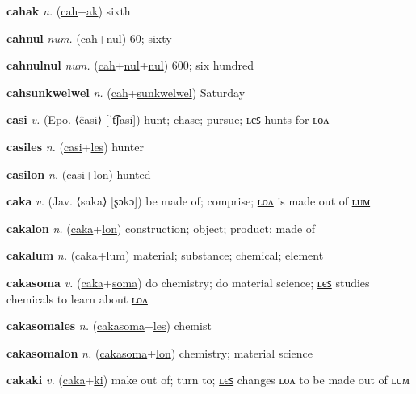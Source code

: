 \textbf{\hypertarget{cahak}{cahak}} \textit{n.} (\hyperlink{cah}{cah}+\allowbreak \hyperlink{ak}{ak})
sixth

\textbf{\hypertarget{cahnul}{cahnul}} \textit{num.} (\hyperlink{cah}{cah}+\allowbreak \hyperlink{nul}{nul})
60; sixty

\textbf{\hypertarget{cahnulnul}{cahnulnul}} \textit{num.} (\hyperlink{cah}{cah}+\allowbreak \hyperlink{nul}{nul}+\allowbreak \hyperlink{nul}{nul})
600; six hundred

\textbf{\hypertarget{cahsunkwelwel}{cahsunkwelwel}} \textit{n.} (\hyperlink{cah}{cah}+\allowbreak \hyperlink{sunkwelwel}{sunkwelwel})
Saturday

\textbf{\hypertarget{casi}{casi}} \textit{v.} (Epo. ⟨ĉasi⟩ [ˈt͡ʃasi])
hunt; chase; pursue; \hyperlink{casiles}{ʟєꜱ} hunts for \hyperlink{casilon}{ʟᴏᴧ}

\textbf{\hypertarget{casiles}{casiles}} \textit{n.} (\hyperlink{casi}{casi}+\allowbreak \hyperlink{les}{les})
hunter

\textbf{\hypertarget{casilon}{casilon}} \textit{n.} (\hyperlink{casi}{casi}+\allowbreak \hyperlink{lon}{lon})
hunted

\textbf{\hypertarget{caka}{caka}} \textit{v.} (Jav. ⟨saka⟩ [ʂɔkɔ])
be made of; comprise; \hyperlink{cakalon}{ʟᴏᴧ} is made out of \hyperlink{cakalum}{ʟᴜᴍ}

\textbf{\hypertarget{cakalon}{cakalon}} \textit{n.} (\hyperlink{caka}{caka}+\allowbreak \hyperlink{lon}{lon})
construction; object; product; made of

\textbf{\hypertarget{cakalum}{cakalum}} \textit{n.} (\hyperlink{caka}{caka}+\allowbreak \hyperlink{lum}{lum})
material; substance; chemical; element

\textbf{\hypertarget{cakasoma}{cakasoma}} \textit{v.} (\hyperlink{caka}{caka}+\allowbreak \hyperlink{soma}{soma})
do chemistry; do material science; \hyperlink{cakasomales}{ʟєꜱ} studies chemicals to learn about \hyperlink{cakasomalon}{ʟᴏᴧ}

\textbf{\hypertarget{cakasomales}{cakasomales}} \textit{n.} (\hyperlink{cakasoma}{cakasoma}+\allowbreak \hyperlink{les}{les})
chemist

\textbf{\hypertarget{cakasomalon}{cakasomalon}} \textit{n.} (\hyperlink{cakasoma}{cakasoma}+\allowbreak \hyperlink{lon}{lon})
chemistry; material science

\textbf{\hypertarget{cakaki}{cakaki}} \textit{v.} (\hyperlink{caka}{caka}+\allowbreak \hyperlink{ki}{ki})
make out of; turn to; \hyperlink{cakakiles}{ʟєꜱ} changes ʟᴏᴧ to be made out of ʟᴜᴍ

